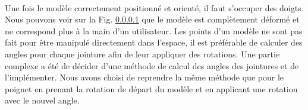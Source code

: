 \paragraph{} 
Une fois le modèle correctement positionné et orienté, il faut s'occuper des doigts.
Nous pouvons voir sur la Fig. \ref{} que le modèle est complètement déformé et ne correspond plus à la main d'un utilisateur. Les points d'un modèle
ne sont pas fait pour être manipulé directement dans l'espace, il est préférable de calculer des angles pour chaque jointure afin de leur appliquer 
des rotations. Une partie complexe a été de décider d'une méthode de calcul des angles des jointures et de l'implémenter.
Nous avons choisi de reprendre la même méthode que pour le poignet en prenant la rotation de départ du modèle et en applicant une rotation avec le nouvel angle.

